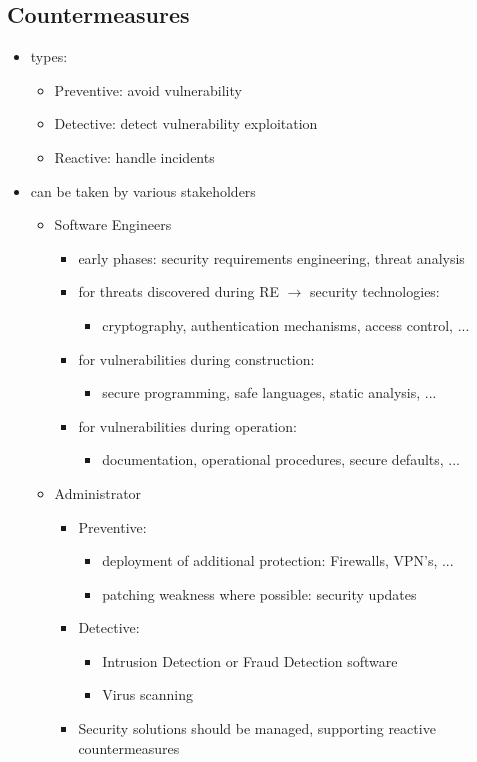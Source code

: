 \documentclass[12pt,titlepage,a4paper]{report}
\begin{document}
	\subsection{Countermeasures}
	\begin{itemize}
		\item types:
		\begin{itemize}
			\item Preventive: avoid vulnerability
			\item Detective: detect vulnerability exploitation
			\item Reactive: handle incidents
		\end{itemize}
		\item can be taken by various stakeholders
		\begin{itemize}
			\item Software Engineers
			\begin{itemize}
				\item early phases: security requirements engineering, threat analysis
				\item for threats discovered during RE $\rightarrow$ security technologies:
				\begin{itemize}
					\item cryptography, authentication mechanisms, access control, ...
				\end{itemize}
				\item for vulnerabilities during construction:
				\begin{itemize}
					\item secure programming, safe languages, static analysis, ...
				\end{itemize}
				\item for vulnerabilities during operation:
				\begin{itemize}
					\item documentation, operational procedures, secure defaults, ...
				\end{itemize}
			\end{itemize}
			\item Administrator
			\begin{itemize}
				\item Preventive:
				\begin{itemize}
					\item deployment of additional protection: Firewalls, VPN's, ...
					\item patching weakness where possible: security updates
				\end{itemize}
				\item Detective:
				\begin{itemize}
					\item Intrusion Detection or Fraud Detection software
					\item Virus scanning
				\end{itemize}
				\item Security solutions should be managed, supporting reactive countermeasures
			 \end{itemize}
		\end{itemize}
	\end{itemize}
\end{document}
